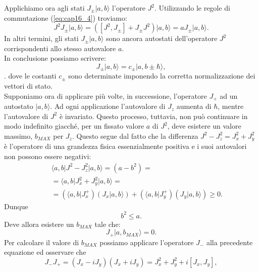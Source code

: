 Applichiamo ora agli stati $ J_{\pm} \vert a, b \rangle$ l'operatore $J^2$. Utilizzando le regole di commutazione (\ref{eq:cap16_4}) troviamo:
\begin{equation}
J^2J_{\pm} \vert a, b \rangle = \left( [J^2,J_{\pm}] + J_{\pm}J^2\right)\vert a, b \rangle = a J_{\pm} \vert a, b \rangle .
\end{equation}
In altri termini, gli stati $J_{\pm} \vert a, b \rangle$ sono ancora autostati dell'operatore $J^2$ corrispondenti allo stesso autovalore $a$.\\
In conclusione possiamo scrivere:
\begin{equation}
J_{\pm} \vert a, b \rangle = c_{\pm}\vert a, b\pm \hbar \rangle,
\label{eq:cap16_5}
\end{equation}.
dove le costanti $c_{\pm}$ sono determinate imponendo la corretta normalizzazione dei vettori di stato.\\
Supponiamo ora di applicare più volte, in successione, l'operatore $J_+$ ad un autostato $\vert a,b \rangle $. Ad ogni applicazione l'autovalore di $J_z$ aumenta di $\hbar$, mentre l'autovalore di $J^2$ è invariato. Questo processo, tuttavia, non può continuare in modo indefinito giacché, per un fissato valore $a$ di $J^2$, deve esistere un valore massimo, $b_{MAX}$ per $J_z$. Questo segue dal fatto che la differenza $J^2-J_z ^2=J_x ^2+J_y ^2$ è l'operatore di una grandezza fisica essenzialmente positiva e i suoi autovalori non possono essere negativi:
\begin{eqnarray}
& &\langle a,b \vert J^2-J_z ^2 \vert a, b \rangle = (a-b^2) = \nonumber \\
& &=\langle a,b \vert J_x ^2+J_y ^2 \vert a, b \rangle = \nonumber \\
& & =\left(\langle a,b \vert J_x ^+\right) \left(J_x \vert a, b \rangle\right)+\left(\langle a,b \vert J_y ^+\right) \left(J_y \vert a, b \rangle\right) \geq 0.
\end{eqnarray}
Dunque
\begin{equation}
b^2 \leq a .
\label{eq:cap16_6}
\end{equation}
Deve allora esistere un $b_{MAX}$ tale che:
\begin{equation}
J_{+} \vert a, b_{MAX} \rangle =0.
\end{equation}
Per calcolare il valore di $b_{MAX}$ possiamo applicare l'operatore $J_-$ alla precedente equazione ed osservare che 
\begin{equation}
J_-J_+ = (J_x-iJ_y)(J_x+iJ_y)= J_x^2 +J_y ^2+i[J_x, J_y] ,
\end{equation}
